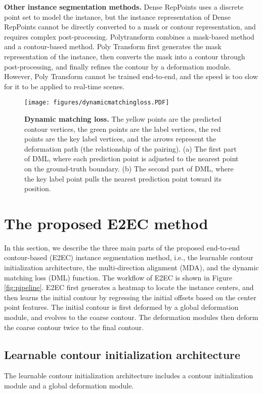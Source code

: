\documentclass[10pt,twocolumn,letterpaper]{article}
\begin{document}
\textbf{Other instance segmentation methods.} Dense RepPoints \cite{densereppoints} uses a discrete point set to model the instance, but the instance representation of Dense RepPoints cannot be directly converted to a mask or contour representation, and requires complex post-processing. Polytransform \cite{polytransform} combines a mask-based method and a contour-based method. Poly Transform first generates the mask representation of the instance, then converts the mask into a contour through post-processing, and finally refines the contour by a deformation module. However, Poly Transform cannot be trained end-to-end, and the speed is too slow for it to be applied to real-time scenes.
\begin{figure}[t]
\texttt{[image: figures/dynamicmatchingloss.PDF]}\vspace{-2mm}
\caption{\textbf{Dynamic matching loss.} The yellow points are the predicted contour vertices, the green points are the label vertices, the red points are the key label vertices, and the arrows represent the deformation path (the relationship of the pairing). (a) The first part of DML, where each prediction point is adjusted to the nearest point on the ground-truth boundary. (b) The second part of DML, where the key label point pulls the nearest prediction point toward its position.}
\label{fig:dml}\vspace{-5mm}
\end{figure}

\section{The proposed E2EC method}
\label{sec:method}

In this section, we describe the three main parts of the proposed end-to-end contour-based (E2EC) instance segmentation method, i.e., the learnable contour initialization architecture, the multi-direction alignment (MDA), and the dynamic matching loss (DML) function. The workflow of E2EC is shown in Figure \ref{fig:pipeline}. E2EC first generates a heatmap to locate the instance centers, and then learns the initial contour by regressing the initial offsets based on the center point features. The initial contour is first deformed by a global deformation module, and evolves to the coarse contour. The deformation modules \cite{deepsnake} then deform the coarse contour twice to the final contour.
\subsection{Learnable contour initialization architecture}
The learnable contour initialization architecture includes a contour initialization module and a global deformation module.
\end{document}

